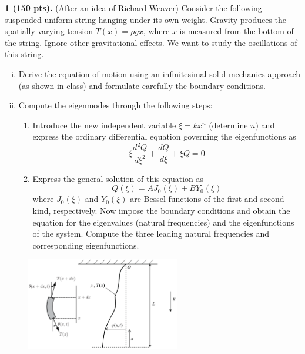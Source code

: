 \pagestyle{fancy}
\setlength{\headheight}{16pt}
\fancyhead{} %
\fancyfoot{} %
\fancyfoot[C]{\thepage}

\begin{problem}
\textbf{1 (150 pts).} (After an idea of Richard Weaver) Consider the following suspended uniform string hanging under its own weight. 
Gravity produces the spatially varying tension $T(x) = \rho g x$, where $x$ is measured from the bottom of the string. 
Ignore other gravitational effects. 
We want to study the oscillations of this string.
\begin{enumerate}[(i)]
    \item {
        Derive the equation of motion using an infinitesimal solid mechanics approach (as shown in class) and formulate carefully the boundary conditions.
    }
    \item {
        Compute the eigenmodes through the following steps:
        \begin{enumerate}[(1)]
            \item {
                Introduce the new independent variable $\xi = kx^n$ (determine $n$) and express the ordinary
                differential equation governing the eigenfunctions as 
                \begin{equation}
                    \xi \frac{d^2 Q }{d\xi^2} + \frac{dQ}{d\xi} + \xi Q = 0
                \end{equation}
            }
            \item {
                Express the general solution of this equation as
                \begin{equation}
                    Q(\xi) = A J_0(\xi) + B Y_0(\xi)
                \end{equation}
                where $J_0(\xi)$ and $Y_0(\xi)$ are Bessel functions of the first and second kind, respectively.
                Now impose the boundary conditions and obtain the equation for the eigenvalues (natural frequencies) and the eigenfunctions of the system. 
                Compute the three leading natural frequencies and corresponding eigenfunctions.
            }
        \end{enumerate}
    }
\end{enumerate}
\end{problem}
\begin{figure}[!ht]
    \centering
    \includegraphics[width=0.6\textwidth]{homework/hw2/assets/hw2_p1.pdf}
    \label{fig:hw2_p1}
\end{figure}
